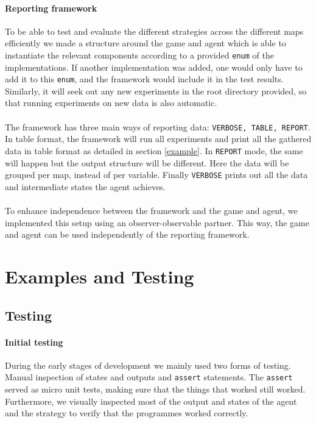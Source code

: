 \documentclass[british]{article}
\newcommand{\code}[1]{\texttt{#1}}
\begin{document}
\paragraph{Reporting framework} To be able to test and evaluate the different strategies across the different maps efficiently we made a structure around the game and agent which is able to instantiate the relevant components according to a provided \code{enum} of the implementations. If another implementation was added, one would only have to add it to this \code{enum}, and the framework would include it in the test results. Similarly, it will seek out any new experiments in the root directory provided, so that running experiments on new data is also automatic.
\paragraph{} The framework has three main ways of reporting data: \code{VERBOSE, TABLE, REPORT}. In table format, the framework will run all experiments and print all the gathered data in table format as detailed in section \ref{example}. In \code{REPORT} mode, the same will happen but the output structure will be different. Here the data will be grouped per map, instead of per variable. Finally \code{VERBOSE} prints out all the data and intermediate states the agent achieves.
\paragraph{} To enhance independence between the framework and the game and agent, we implemented this setup using an observer-observable partner. This way, the game and agent can be used independently of the reporting framework.
\section{Examples and Testing}
\label{sec:testing}

\subsection{Testing}
\label{subsec:testing}
\paragraph{Initial testing} During the early stages of development we mainly used two forms of testing. Manual inspection of states and outputs and \code{assert} statements. The \code{assert} served as micro unit tests, making sure that the things that worked still worked. Furthermore, we visually inspected most of the output and states of the agent and the strategy to verify that the programmes worked correctly.
\end{document}
